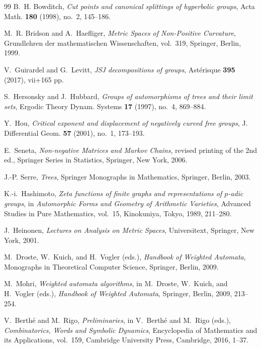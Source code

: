 \documentclass[11pt]{article}
\theoremstyle{definition}
\begin{document}
\begin{thebibliography}{99}
B.~H. Bowditch,
\emph{Cut points and canonical splittings of hyperbolic groups},
Acta Math. \textbf{180} (1998), no.~2, 145--186.

M.~R. Bridson and A.~Haefliger,
\emph{Metric Spaces of Non-Positive Curvature},
Grundlehren der mathematischen Wissenschaften, vol.~319,
Springer, Berlin, 1999.


V.~Guirardel and G.~Levitt,
\emph{JSJ decompositions of groups},
Ast\'erisque \textbf{395} (2017), vii+165 pp.

S.~Hersonsky and J.~Hubbard,
\emph{Groups of automorphisms of trees and their limit sets},
Ergodic Theory Dynam. Systems \textbf{17} (1997), no.~4, 869--884.

Y.~Hou,
\emph{Critical exponent and displacement of negatively curved free groups},
J. Differential Geom. \textbf{57} (2001), no.~1, 173--193.

E.~Seneta,
\emph{Non-negative Matrices and Markov Chains},
revised printing of the 2nd ed., Springer Series in Statistics, Springer, New York, 2006.

J.-P. Serre,
\emph{Trees},
Springer Monographs in Mathematics, Springer, Berlin, 2003.


K.-i.~Hashimoto,
\emph{Zeta functions of finite graphs and representations of $p$-adic groups},
in \emph{Automorphic Forms and Geometry of Arithmetic Varieties},
Advanced Studies in Pure Mathematics, vol.~15, Kinokuniya, Tokyo, 1989, 211--280.

J.~Heinonen,
\emph{Lectures on Analysis on Metric Spaces},
Universitext, Springer, New York, 2001.

M.~Droste, W.~Kuich, and H.~Vogler (eds.),
\emph{Handbook of Weighted Automata},
Monographs in Theoretical Computer Science, Springer, Berlin, 2009.

M.~Mohri,
\emph{Weighted automata algorithms},
in M.~Droste, W.~Kuich, and H.~Vogler (eds.),
\emph{Handbook of Weighted Automata}, Springer, Berlin, 2009, 213--254.

V.~Berth\'e and M.~Rigo,
\emph{Preliminaries},
in V.~Berth\'e and M.~Rigo (eds.),
\emph{Combinatorics, Words and Symbolic Dynamics},
Encyclopedia of Mathematics and its Applications, vol.~159,
Cambridge University Press, Cambridge, 2016, 1--37.


\end{thebibliography}
\end{document}
